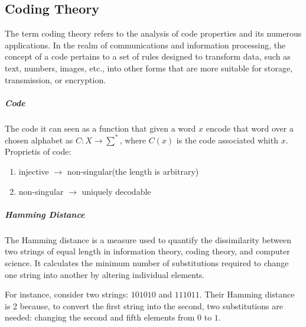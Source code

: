 \subsection{Coding Theory}
The term coding theory refers to the analysis of code properties and its numerous applications. In the realm of communications and information processing, the concept of a code pertains to a set of rules designed to transform data, such as text, numbers, images, etc., into other forms that are more suitable for storage, transmission, or encryption. %
\subparagraph{Code}
The code it can seen as a function that given a word $x$ encode that word over a chosen alphabet as $C: X \rightarrow \sum ^*$, where $C(x)$ is the code associated whith $x$. Proprietis of code:
\begin{enumerate}
 \item injective $\rightarrow$ non-singular(the length is arbitrary)
 \item non-singular $\rightarrow$ uniquely decodable
\end{enumerate}

\subparagraph{Hamming Distance}
The Hamming distance is a measure used to quantify the dissimilarity between two strings of equal length in information theory, coding theory, and computer science. It calculates the minimum number of substitutions required to change one string into another by altering individual elements.

For instance, consider two strings: $101010$ and $111011$. Their Hamming distance is 2 because, to convert the first string into the second, two substitutions are needed: changing the second and fifth elements from $0$ to $1$.

